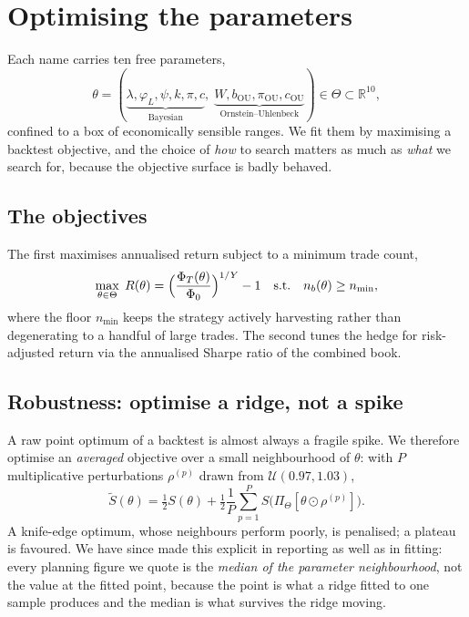 \documentclass[11pt]{article}
\begin{document}
\section{Optimising the parameters}

Each name carries ten free parameters,
\begin{equation}
\theta=(\underbrace{\lambda,\varphi_L,\psi,k,\pi,c}_{\text{Bayesian}},\;
\underbrace{W,b_{\text{OU}},\pi_{\text{OU}},c_{\text{OU}}}_{\text{Ornstein--Uhlenbeck}})
\in\Theta\subset\mathbb R^{10},
\end{equation}
confined to a box of economically sensible ranges. We fit them by maximising a backtest
objective, and the choice of \emph{how} to search matters as much as \emph{what} we search for,
because the objective surface is badly behaved.

\subsection{The objectives}
The first maximises annualised return subject to a minimum trade count,
\begin{equation}
\max_{\theta\in\Theta}\;R(\theta)=\Bigl(\frac{\Phi_T(\theta)}{\Phi_0}\Bigr)^{1/Y}-1
\quad\text{s.t.}\quad n_b(\theta)\ge n_{\min},
\end{equation}
where the floor $n_{\min}$ keeps the strategy actively harvesting rather than degenerating to a
handful of large trades. The second tunes the hedge for risk-adjusted return via the annualised
Sharpe ratio of the combined book.

\subsection{Robustness: optimise a ridge, not a spike}
A raw point optimum of a backtest is almost always a fragile spike. We therefore optimise an
\emph{averaged} objective over a small neighbourhood of $\theta$: with $P$ multiplicative
perturbations $\rho^{(p)}$ drawn from $\mathcal U(0.97,1.03)$,
\begin{equation}
\tilde S(\theta)=\tfrac12 S(\theta)+\tfrac12\frac1P\sum_{p=1}^{P}
S\bigl(\Pi_\Theta[\theta\odot\rho^{(p)}]\bigr).
\end{equation}
A knife-edge optimum, whose neighbours perform poorly, is penalised; a plateau is favoured. We
have since made this explicit in reporting as well as in fitting: every planning figure we quote
is the \emph{median of the parameter neighbourhood}, not the value at the fitted point, because
the point is what a ridge fitted to one sample produces and the median is what survives the ridge
moving.
\end{document}
